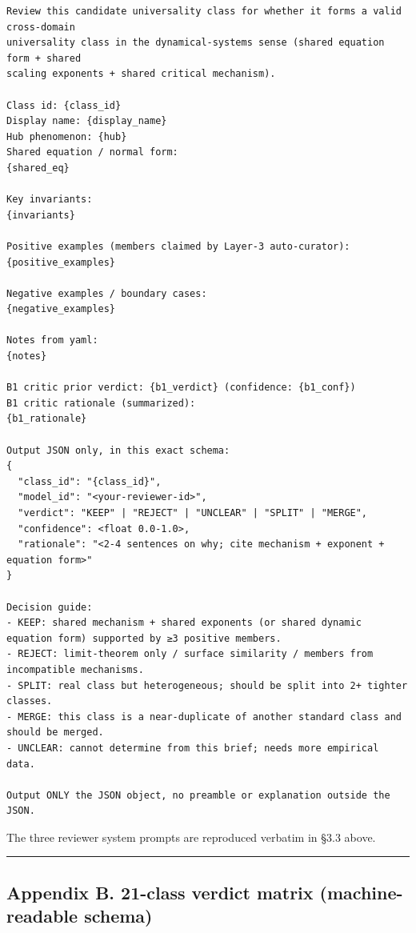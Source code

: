 \documentclass[
  letterpaper,
  11pt]{article}
\begin{document}
\begin{verbatim}
Review this candidate universality class for whether it forms a valid cross-domain
universality class in the dynamical-systems sense (shared equation form + shared
scaling exponents + shared critical mechanism).

Class id: {class_id}
Display name: {display_name}
Hub phenomenon: {hub}
Shared equation / normal form:
{shared_eq}

Key invariants:
{invariants}

Positive examples (members claimed by Layer-3 auto-curator):
{positive_examples}

Negative examples / boundary cases:
{negative_examples}

Notes from yaml:
{notes}

B1 critic prior verdict: {b1_verdict} (confidence: {b1_conf})
B1 critic rationale (summarized):
{b1_rationale}

Output JSON only, in this exact schema:
{
  "class_id": "{class_id}",
  "model_id": "<your-reviewer-id>",
  "verdict": "KEEP" | "REJECT" | "UNCLEAR" | "SPLIT" | "MERGE",
  "confidence": <float 0.0-1.0>,
  "rationale": "<2-4 sentences on why; cite mechanism + exponent + equation form>"
}

Decision guide:
- KEEP: shared mechanism + shared exponents (or shared dynamic equation form) supported by ≥3 positive members.
- REJECT: limit-theorem only / surface similarity / members from incompatible mechanisms.
- SPLIT: real class but heterogeneous; should be split into 2+ tighter classes.
- MERGE: this class is a near-duplicate of another standard class and should be merged.
- UNCLEAR: cannot determine from this brief; needs more empirical data.

Output ONLY the JSON object, no preamble or explanation outside the JSON.
\end{verbatim}

The three reviewer system prompts are reproduced verbatim in §3.3 above.

\begin{center}\rule{0.5\linewidth}{0.5pt}\end{center}

\subsection{Appendix B. 21-class verdict matrix (machine-readable
schema)}\label{appendix-b.-21-class-verdict-matrix-machine-readable-schema}
\end{document}
